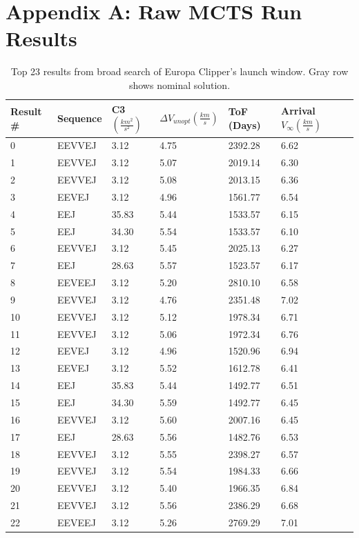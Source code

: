 \documentclass[letterpaper, preprint, paper,11pt]{AAS}	%
\begin{document}
\section{Appendix A: Raw MCTS Run Results}
\begin{table}[h!]
    \centering
    \caption{Top 23 results from broad search of Europa Clipper's launch window. Gray row shows nominal solution.}
    \begin{tabular}{l|llllll}
        Result \# & Sequence   & C3 $(\frac{km^2}{s^2})$    & $\Delta V_{unopt} (\frac{km}{s})$   & ToF (Days)            & Arrival $V_\infty (\frac{km}{s})$            \\
        \hline
        0  & EEVVEJ & 3.12  & 4.75 & 2392.28 & 6.62  \\
        1  & EEVVEJ & 3.12  & 5.07 & 2019.14 & 6.30  \\
        2  & EEVVEJ & 3.12  & 5.08 & 2013.15 & 6.36  \\
        3  & EEVEJ  & 3.12  & 4.96 & 1561.77 & 6.54  \\
        4  & EEJ    & 35.83 & 5.44 & 1533.57 & 6.15  \\
        5  & EEJ    & 34.30 & 5.54 & 1533.57 & 6.10  \\
        6  & EEVVEJ & 3.12  & 5.45 & 2025.13 & 6.27  \\
        7  & EEJ    & 28.63 & 5.57 & 1523.57 & 6.17  \\
        \rowcolor{lightgray}8  & EEVEEJ & 3.12  & 5.20 & 2810.10 & 6.58  \\
        9  & EEVVEJ & 3.12  & 4.76 & 2351.48 & 7.02  \\
        10 & EEVVEJ & 3.12  & 5.12 & 1978.34 & 6.71  \\
        11 & EEVVEJ & 3.12  & 5.06 & 1972.34 & 6.76  \\
        12 & EEVEJ  & 3.12  & 4.96 & 1520.96 & 6.94  \\
        13 & EEVEJ  & 3.12  & 5.52 & 1612.78 & 6.41  \\
        14 & EEJ    & 35.83 & 5.44 & 1492.77 & 6.51  \\
        15 & EEJ    & 34.30 & 5.59 & 1492.77 & 6.45  \\
        16 & EEVVEJ & 3.12  & 5.60 & 2007.16 & 6.45  \\
        17 & EEJ    & 28.63 & 5.56 & 1482.76 & 6.53  \\
        18 & EEVVEJ & 3.12  & 5.55 & 2398.27 & 6.57  \\
        19 & EEVVEJ & 3.12  & 5.54 & 1984.33 & 6.66  \\
        20 & EEVVEJ & 3.12  & 5.40 & 1966.35 & 6.84  \\
        21 & EEVVEJ & 3.12  & 5.56 & 2386.29 & 6.68  \\
        22 & EEVEEJ & 3.12  & 5.26 & 2769.29 & 7.01 
    \end{tabular}
\end{table}
\end{document}

